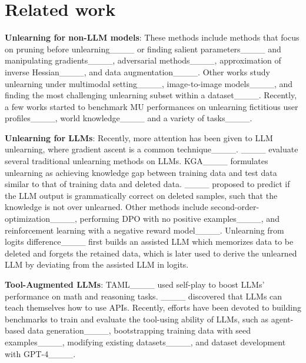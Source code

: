 \section{Related work}
\textbf{Unlearning for non-LLM models}: These methods include 
methods that focus on pruning before unlearning____ or  
finding salient parameters____ and manipulating gradients____, 
adversarial methods____, approximation of inverse Hessian____, and data augmentation____. Other works study unlearning under multimodal setting____, image-to-image models____, and finding the most challenging unlearning subset within a dataset____. Recently, a few works started to benchmark MU performances on unlearning fictitious user profiles____, world knowledge____ and a variety of tasks____.


\textbf{Unlearning for LLMs}: Recently, more attention has been given to LLM unlearning, where gradient ascent is a common technique____. ____ evaluate several traditional unlearning methods on LLMs. KGA____ formulates unlearning as achieving knowledge gap between training data and test data similar to that of training data and deleted data. ____ proposed to predict if the LLM output is grammatically correct on deleted samples, such that the knowledge is not over unlearned. Other methods include second-order-optimization____, performing DPO with no positive examples____, and reinforcement learning with a negative reward model____. Unlearning from logits difference____ first builds an assisted LLM which memorizes data to be deleted and forgets the retained data, which is later used to derive the unlearned LLM by deviating from the assisted LLM in logits. 


\textbf{Tool-Augmented LLMs}: TAML____ used self-play to boost LLMs' performance on math and reasoning tasks. ____ discovered that LLMs can teach themselves how to use APIs. Recently, efforts have been devoted to building benchmarks to train and evaluate the tool-using ability of LLMs, such as agent-based data generation____, bootstrapping training data with seed examples____, modifying existing datasets____, and dataset development with GPT-4____.